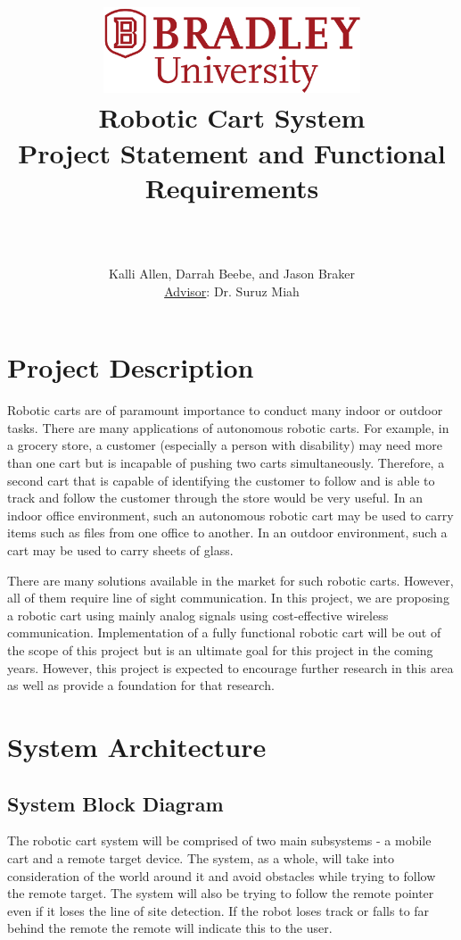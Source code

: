 \documentclass[12pt]{article} %
\title{
    \begin{center}
        \href{http://www.bradley.edu}{\includegraphics[height=1in]{figs/logoBU1-Print}}
        \vskip10pt
        \HRule \\[0.4cm]
        {\Huge \bfseries Robotic Cart System \\\Large Project Statement and Functional Requirements}\\[0.4cm] %
        \HRule \\[0.4cm]
    \end{center}
    }
\author{Kalli Allen, Darrah Beebe, and Jason Braker \\ \underline{Advisor}: Dr. Suruz Miah}
\begin{document}
\maketitle

\newpage %

\section{Project Description}
Robotic carts are of paramount importance to conduct many indoor or outdoor tasks. There are many applications of autonomous robotic carts. For example, in a grocery store, a customer (especially a person with disability) may need more than one cart but is incapable of pushing two carts simultaneously. Therefore, a second cart that is capable of identifying the customer to follow and is able to track and follow the customer through the store would be very useful. In an indoor office environment, such an autonomous robotic cart may be used to carry items such as files from one office to another. In an outdoor environment, such a cart may be used to carry sheets of glass.

There are many solutions available in the market for such robotic carts. However, all of them require line of sight communication. In this project, we are proposing a robotic cart using mainly analog signals using cost-effective wireless communication. Implementation of a fully functional robotic cart will be out of the scope of this project but is an ultimate goal for this project in the coming years. However, this project is expected to encourage further research in this area as well as provide a foundation for that research.

\section{System Architecture}
\subsection{System Block Diagram}
The robotic cart system will be comprised of two main subsystems - a mobile cart and a remote target device. The system, as a whole, will take into consideration of the world around it and avoid obstacles while trying to follow the remote target.  The system will also be trying to follow the remote pointer even if it loses the line of site detection.  If the robot loses track or falls to far behind the remote the remote will indicate this to the user.
\end{document}

